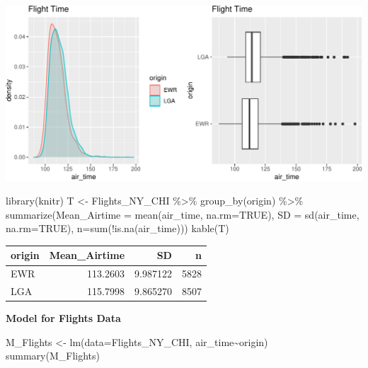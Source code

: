 \documentclass[
  letterpaper,
  DIV=11,
  numbers=noendperiod]{scrreprt}
\newenvironment{Shaded}{\begin{snugshade}}{\end{snugshade}}
\newcommand{\AttributeTok}[1]{\textcolor[rgb]{0.40,0.45,0.13}{#1}}
\newcommand{\ConstantTok}[1]{\textcolor[rgb]{0.56,0.35,0.01}{#1}}
\newcommand{\FunctionTok}[1]{\textcolor[rgb]{0.28,0.35,0.67}{#1}}
\newcommand{\NormalTok}[1]{\textcolor[rgb]{0.00,0.23,0.31}{#1}}
\newcommand{\OtherTok}[1]{\textcolor[rgb]{0.00,0.23,0.31}{#1}}
\newcommand{\SpecialCharTok}[1]{\textcolor[rgb]{0.37,0.37,0.37}{#1}}
\begin{document}
\includegraphics{Ch4_files/figure-pdf/unnamed-chunk-107-1.pdf}

\begin{Shaded}
\begin{Highlighting}[]
\FunctionTok{library}\NormalTok{(knitr)}
\NormalTok{T }\OtherTok{\textless{}{-}}\NormalTok{ Flights\_NY\_CHI }\SpecialCharTok{\%\textgreater{}\%} \FunctionTok{group\_by}\NormalTok{(origin) }\SpecialCharTok{\%\textgreater{}\%} 
  \FunctionTok{summarize}\NormalTok{(}\AttributeTok{Mean\_Airtime =} \FunctionTok{mean}\NormalTok{(air\_time, }\AttributeTok{na.rm=}\ConstantTok{TRUE}\NormalTok{), }
            \AttributeTok{SD =} \FunctionTok{sd}\NormalTok{(air\_time, }\AttributeTok{na.rm=}\ConstantTok{TRUE}\NormalTok{), }\AttributeTok{n=}\FunctionTok{sum}\NormalTok{(}\SpecialCharTok{!}\FunctionTok{is.na}\NormalTok{(air\_time)))}
\FunctionTok{kable}\NormalTok{(T)}
\end{Highlighting}
\end{Shaded}

\begin{longtable}[]{@{}lrrr@{}}
\toprule\noalign{}
origin & Mean\_Airtime & SD & n \\
\midrule\noalign{}
\endhead
\bottomrule\noalign{}
\endlastfoot
EWR & 113.2603 & 9.987122 & 5828 \\
LGA & 115.7998 & 9.865270 & 8507 \\
\end{longtable}

\textbf{Model for Flights Data}

\begin{Shaded}
\begin{Highlighting}[]
\NormalTok{M\_Flights }\OtherTok{\textless{}{-}} \FunctionTok{lm}\NormalTok{(}\AttributeTok{data=}\NormalTok{Flights\_NY\_CHI, air\_time}\SpecialCharTok{\textasciitilde{}}\NormalTok{origin)}
\FunctionTok{summary}\NormalTok{(M\_Flights)}
\end{Highlighting}
\end{Shaded}
\end{document}
